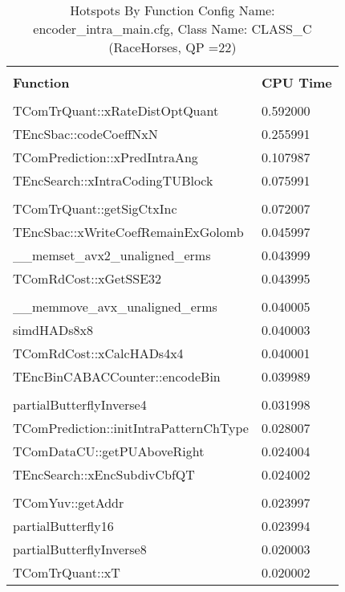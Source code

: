\documentclass{article}%
\begin{document}
\begin{longtabu}{| X[l] | X[l] |}%
\caption{%
Hotspots By Function\newline%
 Config Name: encoder\_intra\_main.cfg,\newline%
 Class Name: CLASS\_C\newline%
 (RaceHorses, QP =22)%
}%
\hline%
&\\%
\textbf{Function}&\textbf{CPU Time}\\%
&\\%
\hline%
\endhead%
TComTrQuant::xRateDistOptQuant&0.592000\\%
\hline%
TEncSbac::codeCoeffNxN&0.255991\\%
\hline%
TComPrediction::xPredIntraAng&0.107987\\%
\hline%
TEncSearch::xIntraCodingTUBlock&0.075991\\%
\hline%
&\\%
\hline%
TComTrQuant::getSigCtxInc&0.072007\\%
\hline%
TEncSbac::xWriteCoefRemainExGolomb&0.045997\\%
\hline%
\_\_memset\_avx2\_unaligned\_erms&0.043999\\%
\hline%
TComRdCost::xGetSSE32&0.043995\\%
\hline%
&\\%
\hline%
\_\_memmove\_avx\_unaligned\_erms&0.040005\\%
\hline%
simdHADs8x8&0.040003\\%
\hline%
TComRdCost::xCalcHADs4x4&0.040001\\%
\hline%
TEncBinCABACCounter::encodeBin&0.039989\\%
\hline%
&\\%
\hline%
partialButterflyInverse4&0.031998\\%
\hline%
TComPrediction::initIntraPatternChType&0.028007\\%
\hline%
TComDataCU::getPUAboveRight&0.024004\\%
\hline%
TEncSearch::xEncSubdivCbfQT&0.024002\\%
\hline%
&\\%
\hline%
TComYuv::getAddr&0.023997\\%
\hline%
partialButterfly16&0.023994\\%
\hline%
partialButterflyInverse8&0.020003\\%
\hline%
TComTrQuant::xT&0.020002\\%
\hline%
\end{longtabu}%
\newpage%
\end{document}
